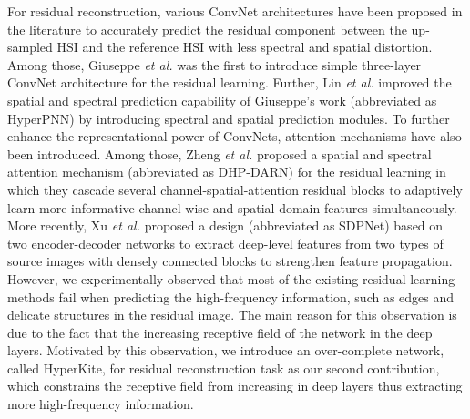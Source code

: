 \documentclass[journal]{IEEEtran}
\begin{document}
\par For residual reconstruction, various ConvNet architectures have been proposed in the literature to accurately predict the residual component between the up-sampled HSI and the reference HSI with less spectral and spatial distortion. Among those, Giuseppe \textit{et al.} \cite{pansharpening_by_CNN} was the first to introduce simple three-layer ConvNet architecture for the residual learning. Further, Lin \textit{et al.} \cite{Hyper-PNN} improved the spatial and spectral prediction capability of Giuseppe's work (abbreviated as HyperPNN) by introducing spectral and spatial prediction modules. To further enhance the representational power of ConvNets, attention mechanisms \cite{attention_hyperspectral} have also been introduced. Among those, Zheng \textit{et al.} \cite{DHP-DARN} proposed a spatial and spectral attention mechanism (abbreviated as DHP-DARN) for the residual learning in which they cascade several channel-spatial-attention residual blocks to adaptively learn more informative channel-wise and spatial-domain features simultaneously. More recently, Xu \textit{et al.} \cite{SPDNet} proposed a design (abbreviated as SDPNet) based on two encoder-decoder networks to extract deep-level features from two types of source images with densely connected blocks
to strengthen feature propagation. However, we experimentally observed that most of the existing residual learning methods fail when predicting the high-frequency information, such as edges and delicate structures in the residual image. The main reason for this observation is due to the fact that the increasing receptive field of the network in the deep layers. Motivated by this observation, we introduce an over-complete network, called HyperKite, for residual reconstruction task as our second contribution, which constrains the receptive field from increasing in deep layers thus extracting more high-frequency information.
\end{document}
